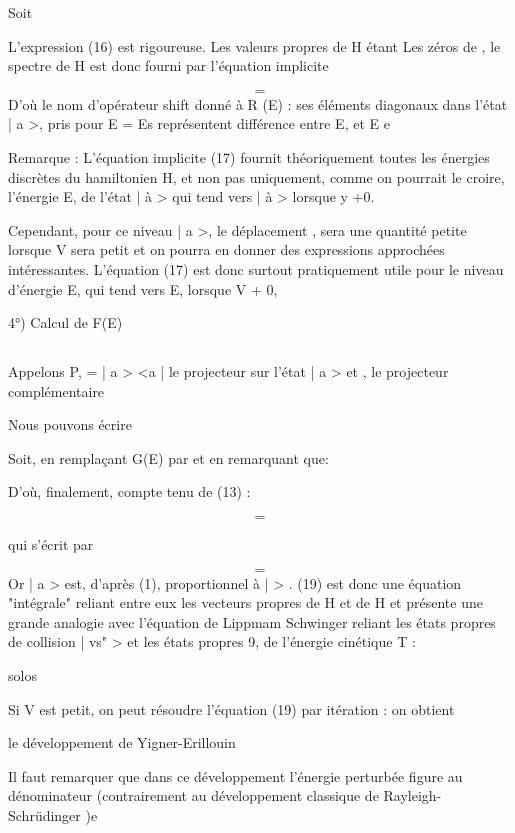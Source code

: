 Soit

L'expression (16) est rigoureuse. Les valeurs propres de H étant Les zéros de
, le spectre de H est donc fourni par l'équation implicite

\[
\tag{17}=
\]
D'où le nom d'opérateur shift donné à R (E) : ses éléments diagonaux dans l'état
| a >, pris pour E = Es représentent  différence entre E, et E e


Remarque : L'équation implicite (17) fournit théoriquement toutes les énergies
discrètes du hamiltonien H, et non pas uniquement, comme on pourrait le croire,
l'énergie E, de l'état | à > qui tend vers | à > lorsque y +0.

Cependant, pour ce niveau | a >, le déplacement ,
sera une quantité petite lorsque V sera petit et on pourra en donner des
expressions approchées intéressantes. L'équation (17) est donc surtout pratiquement utile pour le niveau d'énergie E, qui tend vers E, lorsque V + 0,

4°) Calcul de F(E)

\subsection{}%
Appelons P, = | a > <a | le projecteur sur l'état | a > et
, le projecteur complémentaire

Nous pouvons écrire

Soit, en remplaçant G(E) par  et en remarquant que:

D'où, finalement, compte tenu de (13) :

\[
\tag{18}=
\]

qui s'écrit par

\[
\tag{19}=
\]
Or  | a > est, d'après (1), proportionnel à |  > . (19) est donc une
équation "intégrale" reliant entre eux les vecteurs propres de H et de H et
présente une grande analogie avec l'équation de Lippmam Schwinger reliant les
états propres de collision | vs" > et les états propres 9, de l'énergie cinétique T :

solos

 

 

Si V est petit, on peut résoudre l'équation (19) par itération : on obtient

le développement de Yigner-Erillouin

Il faut remarquer que dans ce développement l'énergie perturbée figure au
dénominateur (contrairement au développement classique de Rayleigh-Schrüdinger )e

